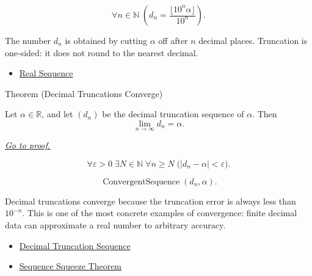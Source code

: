 \begin{remark*}
\[
\forall n\in\mathbb{N}\;
\left(
  d_n=\frac{\lfloor 10^n\alpha\rfloor}{10^n}
\right).
\]
\end{remark*}

\begin{remark*}[Interpretation]
The number $d_n$ is obtained by cutting $\alpha$ off after $n$ decimal
places. Truncation is one-sided: it does not round to the nearest decimal.
\end{remark*}

\begin{dependencies}
\begin{itemize}
  \item \hyperref[def:real-sequence]{Real Sequence}
\end{itemize}
\end{dependencies}


\begin{theorembox}{Theorem (Decimal Truncations Converge)}
\begin{theorem}
\label{thm:decimal-truncations-converge}
Let $\alpha\in\mathbb{R}$, and let $(d_n)$ be the decimal truncation
sequence of $\alpha$. Then
\[
  \lim_{n\to\infty}d_n=\alpha.
\]

\smallskip
\noindent
\hyperref[prf:decimal-truncations-converge]{\textit{Go to proof.}}
\end{theorem}
\end{theorembox}

\begin{remark*}
\[
\forall \varepsilon>0\;\exists N\in\mathbb{N}\;\forall n\ge N
\;\bigl(|d_n-\alpha|<\varepsilon\bigr).
\]
\end{remark*}

\begin{remark*}
\[
\operatorname{ConvergentSequence}(d_n,\alpha).
\]
\end{remark*}

\begin{remark*}[Interpretation]
Decimal truncations converge because the truncation error is always less
than $10^{-n}$. This is one of the most concrete examples of convergence:
finite decimal data can approximate a real number to arbitrary accuracy.
\end{remark*}

\begin{dependencies}
\begin{itemize}
  \item \hyperref[def:decimal-truncation-sequence]{Decimal Truncation Sequence}
  \item \hyperref[thm:sequence-squeeze-theorem]{Sequence Squeeze Theorem}
\end{itemize}
\end{dependencies}
